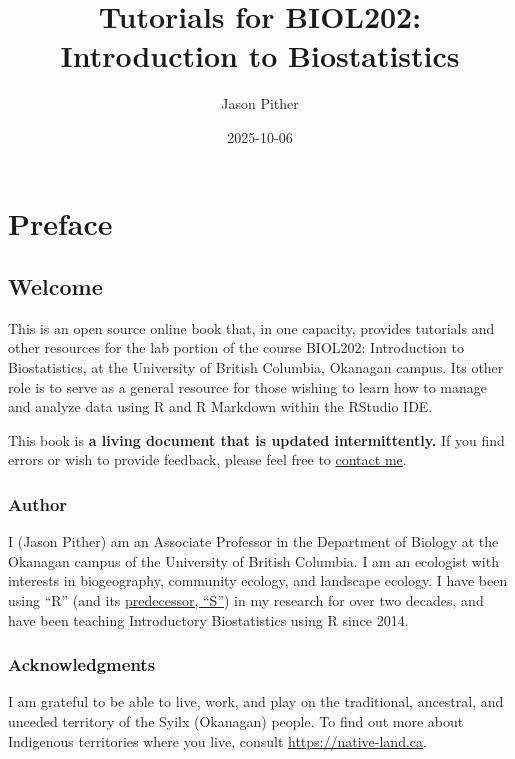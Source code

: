 \documentclass[
]{book}
\title{Tutorials for BIOL202: Introduction to Biostatistics}
\author{Jason Pither}
\date{2025-10-06}
\begin{document}
\maketitle

{
\setcounter{tocdepth}{1}
\tableofcontents
}
\part*{Preface}\label{part-preface}

\chapter*{Welcome}\label{welcome}

This is an open source online book that, in one capacity, provides tutorials and other resources for the lab portion of the course BIOL202: Introduction to Biostatistics, at the University of British Columbia, Okanagan campus. Its other role is to serve as a general resource for those wishing to learn how to manage and analyze data using R and R Markdown within the RStudio IDE.

This book is \textbf{a living document that is updated intermittently.} If you find errors or wish to provide feedback, please feel free to \href{https://jasonpither.weebly.com/people.html}{contact me}.

\section*{Author}\label{author}

I (Jason Pither) am an Associate Professor in the Department of Biology at the Okanagan campus of the University of British Columbia. I am an ecologist with interests in biogeography, community ecology, and landscape ecology. I have been using ``R'' (and its \href{https://en.wikipedia.org/wiki/R_(programming_language)\#History}{predecessor, ``S''}) in my research for over two decades, and have been teaching Introductory Biostatistics using R since 2014.

\section*{Acknowledgments}\label{acknowledgments}

I am grateful to be able to live, work, and play on the traditional, ancestral, and unceded territory of the Syilx (Okanagan) people. To find out more about Indigenous territories where you live, consult \url{https://native-land.ca}.
\end{document}
